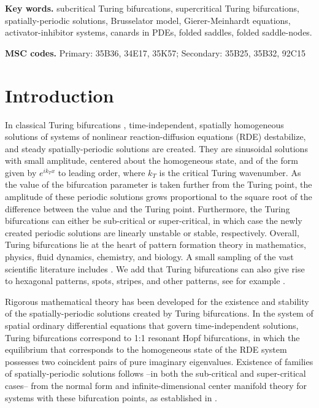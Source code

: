 \documentclass[11pt]{article}
\numberwithin{equation}{section}
\begin{document}
\medskip 

\noindent
{\bf Key words.} 
subcritical Turing bifurcations,
supercritical Turing bifurcations,
spatially-periodic solutions,
Brusselator model,
Gierer-Meinhardt equations,
activator-inhibitor systems,
canards in PDEs,
folded saddles,
folded saddle-nodes.


\medskip 

\noindent
{\bf MSC codes.} 
Primary: 35B36, 34E17, 35K57; 
Secondary: 35B25, 35B32, 92C15

\section{Introduction}

In classical Turing bifurcations \cite{T1952}, time-independent, spatially homogeneous solutions of systems of nonlinear reaction-diffusion equations (RDE) destabilize, and steady spatially-periodic solutions are created.
They are sinusoidal solutions with small amplitude, centered about the homogeneous state, and of the form given by $e^{ik_T x}$ to leading order, where $k_T$ is the critical Turing wavenumber.
As the value of the bifurcation parameter is taken further from the Turing point, the amplitude of these periodic solutions grows proportional to the square root of the difference between the value and the Turing point. 
Furthermore, the Turing bifurcations can either be sub-critical or super-critical, in which case the newly created periodic solutions are linearly unstable or stable, respectively.
Overall, Turing bifurcations lie at the heart of pattern formation
theory in mathematics, physics, fluid dynamics, chemistry, and biology.
A small sampling of the vast scientific literature includes
\cite{AK2002,B1978,CH1993,DES1971,EK2005,EP1998,GS1997,H2006,IMD1989,K1999,K2015,K1984,LE1992,LE1991,M1989,Mu1982,NW1969,PL1968,S2003,SS1971,W1997}.
We add that Turing bifurcations can also give
rise to hexagonal patterns, spots, stripes, and other patterns, see for example \cite{AK2002,CH1993,EP1998,K2015,LE1992,LE1991,W1997}.

Rigorous mathematical theory has been developed for the existence and stability of the spatially-periodic solutions created by Turing bifurcations.
In the system of spatial ordinary differential equations that govern time-independent solutions, Turing bifurcations correspond to 1:1 resonant Hopf bifurcations, in which the equilibrium that corresponds to the homogeneous state of the RDE system possesses two coincident pairs of pure imaginary eigenvalues.
Existence of families of spatially-periodic solutions follows --in both the sub-critical and super-critical cases-- from the normal form and infinite-dimensional center manifold theory for systems with these bifurcation points, as established in \cite{HI2011,IP1993}.
\end{document}
